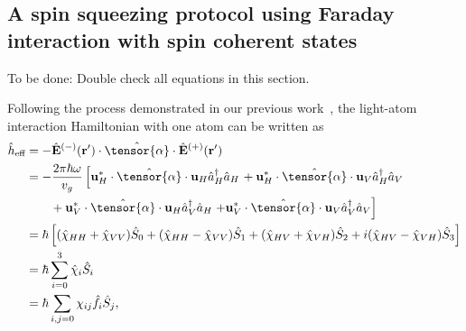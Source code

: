 \documentclass[preprint,aps,pra,onecolumn,superscriptaddress]{revtex4-1} %
\def\br{\mathbf{r}}
\newcommand{\nn}{\nonumber}
\newcommand{\eff}{\text{eff}}
\newcommand{\comment}[1]{{\color{Maroon} #1}}
\begin{document}
\subsection{A spin squeezing protocol using Faraday interaction with spin coherent states}
\comment{To be done: Double check all equations in this section.}

Following the process demonstrated in our previous work~\cite{Qi2016}, the light-atom interaction Hamiltonian with one atom can be written as
\begin{align}
\hat{h}_\eff &= -\hat{\mathbf{E}}^{(-)}(\br')\cdot\hat{\tensor{\mathbf{\alpha}}}\cdot\hat{\mathbf{E}}^{(+)}(\br')\nn\\
&= -\frac{2\pi\hbar\omega}{v_g}\left[\mathbf{u}_H^*\cdot\hat{\tensor{\mathbf{\alpha}}}\cdot \mathbf{u}_H\hat{a}_H^\dagger\hat{a}_H\right.
+ \mathbf{u}_H^*\cdot\hat{\tensor{\mathbf{\alpha}}}\cdot \mathbf{u}_V\hat{a}_H^\dagger\hat{a}_V\nn\\
&\quad\quad + \mathbf{u}_V^*\cdot\hat{\tensor{\mathbf{\alpha}}}\cdot \mathbf{u}_H\hat{a}_V^\dagger\hat{a}_H 
\left. + \mathbf{u}_V^*\cdot\hat{\tensor{\mathbf{\alpha}}}\cdot \mathbf{u}_V\hat{a}_V^\dagger\hat{a}_V\right]\\
&= \hbar\left[(\hat{\chi}_{HH}+\hat{\chi}_{VV})\hat{S}_0 + (\hat{\chi}_{HH}-\hat{\chi}_{VV})\hat{S}_1 + (\hat{\chi}_{HV}+\hat{\chi}_{VH})\hat{S}_2 + i(\hat{\chi}_{HV}-\hat{\chi}_{VH})\hat{S}_3 \right]\\
&=\hbar\sum_{i=0}^3 \hat{\chi}_{i}\hat{S}_i\\
&=\hbar\sum_{i,j=0} \chi_{ij}\hat{f}_i\hat{S}_j,
\end{align}
\end{document}
